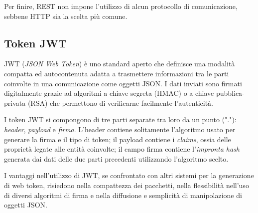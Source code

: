 	Per finire, REST non impone l'utilizzo di alcun protocollo di comunicazione, sebbene HTTP sia la scelta più comune\cite{doc:apirest}.
	
\subsection{Token JWT}
	
	JWT (\emph{JSON Web Token}) è uno standard aperto che definisce una modalità compatta ed autocontenuta adatta a trasmettere informazioni tra le parti coinvolte in una comunicazione come oggetti JSON.
	I dati inviati sono firmati digitalmente grazie ad algoritmi a chiave segreta (HMAC) o a chiave pubblica-privata (RSA) che permettono di verificarne facilmente l'autenticità.
	
	I token JWT si compongono di tre parti separate tra loro da un punto ("."):
	\emph{header}, \emph{payload} e \emph{firma}.
	L'header contiene solitamente l'algoritmo usato per generare la firma e il tipo di token;
	il payload contiene i \emph{claims}, ossia delle proprietà legate alle entità coinvolte;
	il campo firma contiene l'\emph{impronta hash} generata dai dati delle due parti precedenti utilizzando l'algoritmo scelto.
	
	I vantaggi nell'utilizzo di JWT, se confrontato con altri sistemi per la generazione di web token, risiedono nella compattezza dei pacchetti, nella flessibilità nell'uso di diversi algoritmi di firma e nella diffusione e semplicità di manipolazione di oggetti JSON\cite{doc:intro_jwt}.
	
	
	
	
	
	
	
	
	
	
	
	
	
	
	
	
	
	
	
	
	
	
	
	
	
	
	
	
	
	
	
	
	
	
	
	
	
	
	
	
	
	
	
	
	
	
	
	